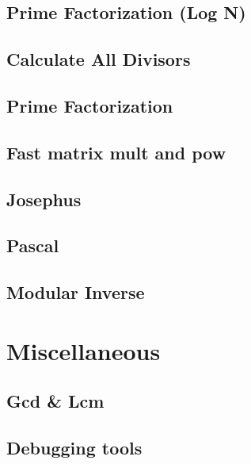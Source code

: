 \subsection{Prime Factorization (Log N)}
\raggedbottom
\hrulefill
\subsection{Calculate All Divisors}
\raggedbottom
\hrulefill
\subsection{Prime Factorization}
\raggedbottom
\hrulefill
\subsection{Fast matrix mult and pow}
\raggedbottom
\hrulefill
\subsection{Josephus}
\raggedbottom
\hrulefill
\subsection{Pascal}
\raggedbottom
\hrulefill
\subsection{Modular Inverse}
\raggedbottom
\hrulefill
\section{Miscellaneous}
\subsection{Gcd \& Lcm}
\raggedbottom
\hrulefill
\subsection{Debugging tools}
\raggedbottom
\hrulefill
